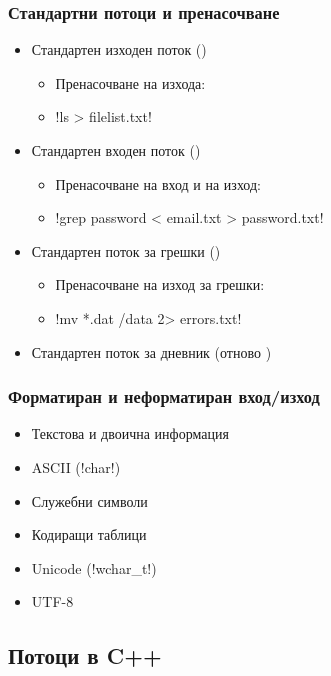 \documentclass{beamer}
\begin{document}
\begin{frame}[fragile]
  \frametitle{Стандартни потоци и пренасочване}

  \begin{itemize}[<+->]
  \item Стандартен изходен поток  ()
    \begin{itemize}[<.->]
    \item Пренасочване на изхода:
    \item \lst!ls > filelist.txt!
    \end{itemize}
  \item Стандартен входен поток  ()
    \begin{itemize}[<.->]
    \item Пренасочване на вход и на изход:
    \item \lst!grep password < email.txt > password.txt!
    \end{itemize}
  \item Стандартен поток за грешки  ()
    \begin{itemize}[<.->]
    \item Пренасочване на изход за грешки:
    \item \lst!mv *.dat /data 2> errors.txt!
    \end{itemize}
  \item Стандартен поток за дневник  (отново )
  \end{itemize}
\end{frame}

\begin{frame}[fragile]
  \frametitle{Форматиран и неформатиран вход/изход}

  \begin{itemize}[<+->]
  \item Текстова и двоична информация
  \item ASCII (\lst!char!)
  \item Служебни символи
  \item Кодиращи таблици
  \item Unicode (\lst!wchar_t!)
  \item UTF-8
  \end{itemize}
\end{frame}

\subsection{Потоци в C++}
\end{document}
